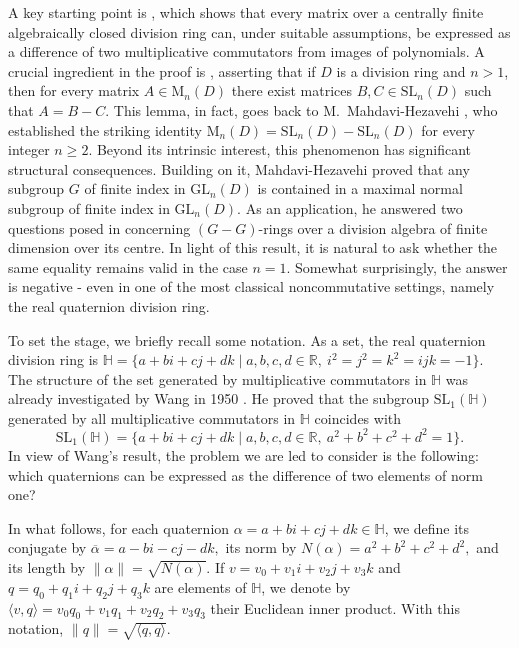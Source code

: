 \documentclass[11pt]{article}
\theoremstyle{definition}
\begin{document}
{{{{				A key starting point is \cite[Theorem~4.9]{Pa_PaSo_26}, which shows that every matrix over a centrally finite algebraically closed division ring can, under suitable assumptions, be expressed as a difference of two multiplicative commutators from images of polynomials.  A crucial ingredient in the proof is \cite[Lemma~4.7]{Pa_PaSo_26}, asserting that if $D$ is a division ring and $n > 1$, then for every matrix $A \in \mathrm{M}_n(D)$ there exist matrices $B, C \in \mathrm{SL}_n(D)$ such that $A = B - C$. This lemma, in fact, goes back to M.~Mahdavi-Hezavehi \cite[Lemma~5.1]{Pa_Mad_00}, who established the striking identity
				$\mathrm{M}_n(D) = \mathrm{SL}_n(D) - \mathrm{SL}_n(D)$
				for every integer $n \ge 2$. Beyond its intrinsic interest, this phenomenon has significant structural consequences. Building on it, Mahdavi-Hezavehi proved that any subgroup $G$ of finite index in $\mathrm{GL}_n(D)$ is contained in a maximal normal subgroup of finite index in $\mathrm{GL}_n(D)$. As an application, he answered two questions posed in \cite{Pa_Be_92} concerning $(G - G)$-rings over a division algebra of finite dimension over its centre. In light of this result, it is natural to ask whether the same equality remains valid in the case $n = 1$. Somewhat surprisingly, the answer is negative - even in one of the most classical noncommutative settings, namely the real quaternion division ring.
				
				
				To set the stage, we briefly recall some notation. As a set, the real quaternion division ring is $\mathbb{H}
				= \{ a + bi + cj + dk \mid a,b,c,d \in \mathbb{R},\ i^2 = j^2 = k^2 = ijk = -1 \}.$
				The structure of the set generated by multiplicative commutators in $\mathbb{H}$ was already investigated by Wang in 1950 \cite{Pa_Wa_50}. He proved that the subgroup  $\mathrm{SL}_1(\mathbb{H})$ generated by all multiplicative commutators in $\mathbb{H}$ coincides with
				\[
				\mathrm{SL}_1(\mathbb{H})
				= \{ a + bi + cj + dk \mid a,b,c,d \in \mathbb{R},\ a^2+b^2+c^2+d^2 = 1 \}.
				\]
				In view of Wang's result, the problem we are led to consider is the following: which quaternions can be expressed as the difference of two elements of norm one?
				
				In what follows, for each quaternion $\alpha = a + bi + cj + dk \in \mathbb{H}$, we  define its conjugate by
				$\overline{\alpha} = a - bi - cj - dk,$
				its norm by
				$N(\alpha) = a^2 + b^2 + c^2 + d^2,$
				and its length by $\|\alpha\| = \sqrt{N(\alpha)}.$
				If $v = v_0 + v_1 i + v_2 j + v_3 k$ and $q = q_0 + q_1 i + q_2 j + q_3 k$ are elements of $\mathbb{H}$, we denote by
				$\langle v, q \rangle = v_0 q_0 + v_1 q_1 + v_2 q_2 + v_3 q_3$
				their Euclidean inner product. With this notation, $\|q\| = \sqrt{\langle q,q \rangle}$.
				
}}}}
\end{document}
